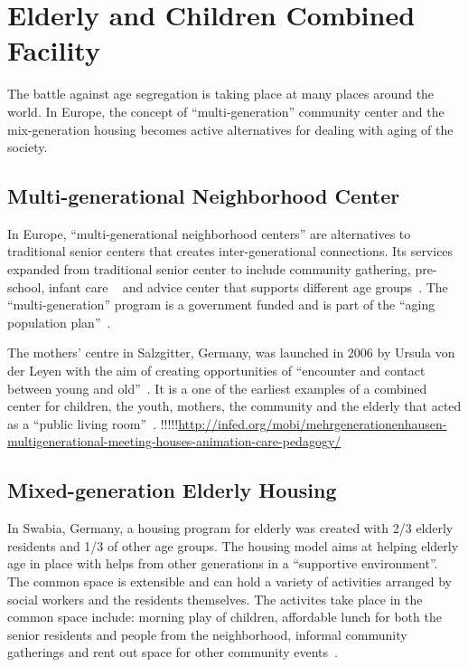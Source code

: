 \section{Elderly and Children Combined Facility}
The battle against age segregation is taking place at many places
around the world. In Europe, the concept of ``multi-generation''
community center and the mix-generation housing becomes active
alternatives for dealing with aging of the society.

\subsection{Multi-generational Neighborhood Center}
In Europe, ``multi-generational neighborhood centers'' are
alternatives to traditional senior centers that creates
inter-generational connections. Its services expanded from traditional
senior center to include community gathering, pre-school, infant
care ~\cite{Fromm2015} and advice center that supports different age groups~\cite{Smith2014}. The ``multi-generation'' program is a
government funded and is part of the ``aging population plan''~\cite{Smith2014}.

The mothers' centre in Salzgitter, Germany, was launched in 2006 by
Ursula von der Leyen with the aim of creating opportunities of
``encounter and contact between young and old''~\cite{Smith2014}. It
is a one of the earliest examples of a combined center for children,
the youth, mothers, the community and the elderly that acted as a
``public living room''~\cite{Smith2014}.
!!!!!\url{http://infed.org/mobi/mehrgenerationenhausen-multigenerational-meeting-houses-animation-care-pedagogy/}

\subsection{Mixed-generation Elderly Housing}
In Swabia, Germany, a housing program for elderly was created with 2/3
elderly residents and 1/3 of other age groups. The housing model aims
at helping elderly age in place with helps from other generations in a
``supportive environment''. The common space is extensible and can
hold a variety of activities arranged by social workers and the
residents themselves. The activites take place in the common space
include: morning play of children, affordable lunch for both the
senior residents and people from the neighborhood, informal community
gatherings and rent out space for other community events~\cite{Fromm2015}.

